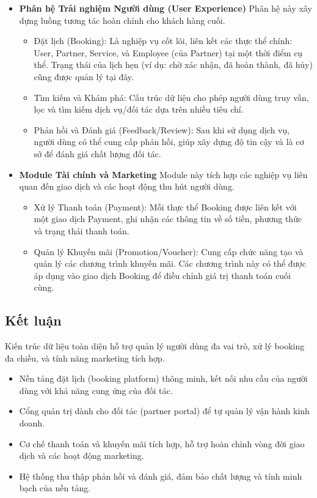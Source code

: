 \begin{itemize}
\begin{itemize}
            \end{itemize}
        \item \textbf{Phân hệ Trải nghiệm Người dùng (User Experience)} Phân hệ này xây dựng luồng tương tác hoàn chỉnh cho khách hàng cuối.
            \begin{itemize}
                \item Đặt lịch (Booking): Là nghiệp vụ cốt lõi, liên kết các thực thể chính: User, Partner, Service, và Employee (của Partner) tại một thời điểm cụ thể. Trạng thái của lịch hẹn (ví dụ: chờ xác nhận, đã hoàn thành, đã hủy) cũng được quản lý tại đây.
            \item Tìm kiếm và Khám phá: Cấu trúc dữ liệu cho phép người dùng truy vấn, lọc và tìm kiếm dịch vụ/đối tác dựa trên nhiều tiêu chí.
            \item Phản hồi và Đánh giá (Feedback/Review): Sau khi sử dụng dịch vụ, người dùng có thể cung cấp phản hồi, giúp xây dựng độ tin cậy và là cơ sở để đánh giá chất lượng đối tác. 
            \end{itemize}
        \item \textbf{Module Tài chính và Marketing}
        Module này tích hợp các nghiệp vụ liên quan đến giao dịch và các hoạt động thu hút người dùng.
            \begin{itemize}
                \item Xử lý Thanh toán (Payment): Mỗi thực thể Booking được liên kết với một giao dịch Payment, ghi nhận các thông tin về số tiền, phương thức và trạng thái thanh toán.
                \item Quản lý Khuyến mãi (Promotion/Voucher): Cung cấp chức năng tạo và quản lý các chương trình khuyến mãi. Các chương trình này có thể được áp dụng vào giao dịch Booking để điều chỉnh giá trị thanh toán cuối cùng.
            \end{itemize}
        \end{itemize}
\subsection{Kết luận}
Kiến trúc dữ liệu toàn diện hỗ trợ quản lý người dùng đa vai trò, xử lý booking đa chiều, và tính năng marketing tích hợp.
    \begin{itemize}
        \item Nền tảng đặt lịch (booking platform) thông minh, kết nối nhu cầu của người dùng với khả năng cung ứng của đối tác.
        \item Cổng quản trị dành cho đối tác (partner portal) để tự quản lý vận hành kinh doanh.
        \item Cơ chế thanh toán và khuyến mãi tích hợp, hỗ trợ hoàn chỉnh vòng đời giao dịch và các hoạt động marketing.
        \item Hệ thống thu thập phản hồi và đánh giá, đảm bảo chất lượng và tính minh bạch của nền tảng.
    \end{itemize}
